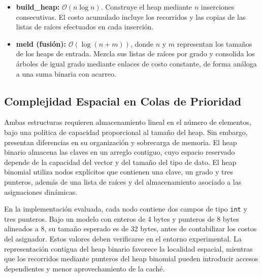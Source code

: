 \documentclass[11pt,letterpaper]{article}
\begin{document}
\begin{enumerate}
\begin{itemize}
    \item \textbf{build\_heap:} $\mathcal{O}(n\log n)$.
    Construye el heap mediante $n$ inserciones consecutivas.
    El costo acumulado incluye los recorridos y las copias
    de las listas de raíces efectuados en cada inserción.

    \item \textbf{meld (fusión):} $\mathcal{O}(\log(n+m))$,
    donde $n$ y $m$ representan los tamaños de los heaps
    de entrada. Mezcla sus listas de raíces por grado y
    consolida los árboles de igual grado mediante enlaces
    de costo constante, de forma análoga a una suma binaria
    con acarreo.
\end{itemize}
\end{enumerate}

\subsection{Complejidad Espacial en Colas de Prioridad}
Ambas estructuras requieren almacenamiento lineal en el número de elementos, bajo una política de capacidad proporcional al tamaño del heap. Sin embargo, presentan diferencias en su organización y sobrecarga de memoria. El heap binario almacena las claves en un arreglo contiguo, cuyo espacio reservado depende de la capacidad del vector y del tamaño del tipo de dato. El heap binomial utiliza nodos explícitos que contienen una clave, un grado y tres punteros, además de una lista de raíces y del almacenamiento asociado a las asignaciones dinámicas.

En la implementación evaluada, cada nodo contiene dos campos de tipo \texttt{int} y tres punteros. Bajo un modelo con enteros de 4 bytes y punteros de 8 bytes alineados a 8, su tamaño esperado es de 32 bytes, antes de contabilizar los costos del asignador. Estos valores deben verificarse en el entorno experimental. La representación contigua del heap binario favorece la localidad espacial, mientras que los recorridos mediante punteros del heap binomial pueden introducir accesos dependientes y menor aprovechamiento de la caché.
\end{document}
